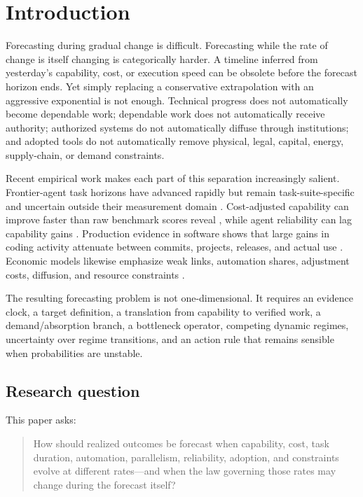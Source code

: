 
\section{Introduction}

Forecasting during gradual change is difficult. Forecasting while the rate of change is itself changing is categorically harder. A timeline inferred from yesterday's capability, cost, or execution speed can be obsolete before the forecast horizon ends. Yet simply replacing a conservative extrapolation with an aggressive exponential is not enough. Technical progress does not automatically become dependable work; dependable work does not automatically receive authority; authorized systems do not automatically diffuse through institutions; and adopted tools do not automatically remove physical, legal, capital, energy, supply-chain, or demand constraints.

Recent empirical work makes each part of this separation increasingly salient. Frontier-agent task horizons have advanced rapidly but remain task-suite-specific and uncertain outside their measurement domain \citep{kwa2025,metr2026}. Cost-adjusted capability can improve faster than raw benchmark scores reveal \citep{gundlach2025,erol2025}, while agent reliability can lag capability gains \citep{rabanser2026}. Production evidence in software shows that large gains in coding activity attenuate between commits, projects, releases, and actual use \citep{demirer2026}. Economic models likewise emphasize weak links, automation shares, adjustment costs, diffusion, and resource constraints \citep{erdil2025gate,jones2025rnd,jones2026future,trammell2023,davidson2026}.

The resulting forecasting problem is not one-dimensional. It requires an evidence clock, a target definition, a translation from capability to verified work, a demand/absorption branch, a bottleneck operator, competing dynamic regimes, uncertainty over regime transitions, and an action rule that remains sensible when probabilities are unstable.

\subsection{Research question}

This paper asks:

\begin{quote}
How should realized outcomes be forecast when capability, cost, task duration, automation, parallelism, reliability, adoption, and constraints evolve at different rates—and when the law governing those rates may change during the forecast itself?
\end{quote}

